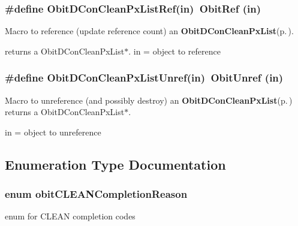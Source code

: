\subsubsection{\setlength{\rightskip}{0pt plus 5cm}\#define Obit\-DCon\-Clean\-Px\-List\-Ref(in)\ Obit\-Ref (in)}\label{ObitDConCleanPxList_8h_a1}


Macro to reference (update reference count) an {\bf Obit\-DCon\-Clean\-Px\-List}{\rm (p.\,\pageref{structObitDConCleanPxList})}. 

returns a Obit\-DCon\-Clean\-Px\-List$\ast$. in = object to reference 
\subsubsection{\setlength{\rightskip}{0pt plus 5cm}\#define Obit\-DCon\-Clean\-Px\-List\-Unref(in)\ Obit\-Unref (in)}\label{ObitDConCleanPxList_8h_a0}


Macro to unreference (and possibly destroy) an {\bf Obit\-DCon\-Clean\-Px\-List}{\rm (p.\,\pageref{structObitDConCleanPxList})} returns a Obit\-DCon\-Clean\-Px\-List$\ast$. 

in = object to unreference 

\subsection{Enumeration Type Documentation}
\subsubsection{\setlength{\rightskip}{0pt plus 5cm}enum {\bf obit\-CLEANCompletion\-Reason}}\label{ObitDConCleanPxList_8h_a24}


enum for CLEAN completion codes 

